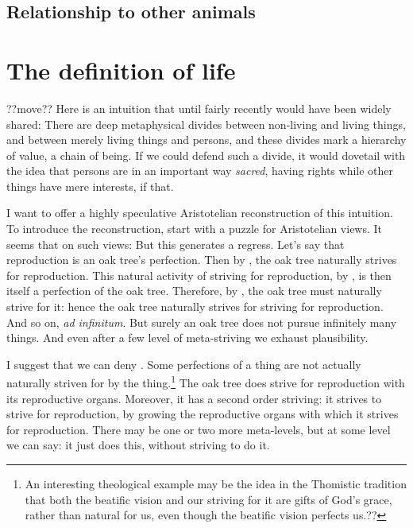 \subsection{Relationship to other animals}

\section{The definition of life}??move??
Here is an intuition that until fairly recently would have been widely shared: There are deep metaphysical divides between non-living and living things,
and between merely living things and persons, and these divides mark a hierarchy of value, a chain of being. If we could defend such a divide, it would
dovetail with the idea that persons are in an important way \textit{sacred}, having rights while other things have mere interests, if that.

I want to offer a highly speculative Aristotelian reconstruction of this intuition. To introduce the reconstruction, start with a puzzle for
Aristotelian views. It seems that on such views:
But this generates a regress. Let's say that reproduction is an oak tree's perfection. Then by , the oak tree naturally strives for
reproduction. This natural activity of striving for reproduction, by , is then itself a perfection of the oak tree. Therefore,
by , the oak tree must naturally strive for it: hence the oak tree naturally strives for striving for reproduction. And so on,
\textit{ad infinitum}. But surely an oak tree does not pursue infinitely many things. And even after a few level of meta-striving we exhaust plausibility.

I suggest that we can deny . Some perfections of a thing are not actually naturally striven for by the thing.\footnote{An interesting
theological example may be the idea in the Thomistic tradition that both the beatific vision and our striving for it are gifts of God's grace, rather than
natural for us, even though the beatific vision perfects us.??} The oak tree does strive for reproduction with its reproductive organs. Moreover, it has a
second order striving: it strives to strive for reproduction, by growing the reproductive organs with which it strives for reproduction. There may be one or
two more meta-levels, but at some level we can say: it just does this, without striving to do it.

